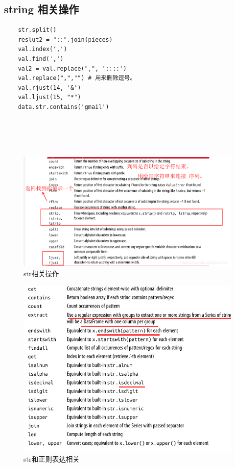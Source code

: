 \documentclass{article}
\begin{document}
\subsection{string 相关操作}
\begin{lstlisting}
	str.split()
	reslut2 = "::".join(pieces)
	val.index(',')
	val.find(',')
	val2 = val.replace(",", '::::')
	val.replace(",","") # 用来删除逗号。
	val.rjust(14, '&')
	val.ljust(15, "*")
	data.str.contains('gmail')
	
	
	
	
\end{lstlisting}
\begin{figure}[htpb]
	\centering
	\includegraphics[width=\linewidth]{fig/na3}
	\caption{str相关操作}
	\label{fig-strcaozuo}
\end{figure}

\begin{figure}[htpb]
	\centering
	\includegraphics[width=\linewidth]{fig/a1}
	\caption{str和正则表达相关}
	\label{fig-reg}
\end{figure}
\end{document}
